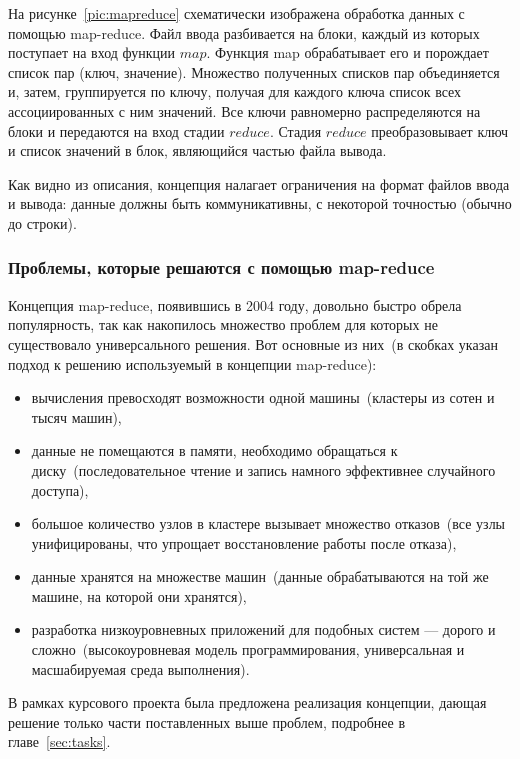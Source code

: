 \documentclass[12pt,a4paper,oneside]{extarticle}
\begin{document}
        На рисунке~\ref{pic:mapreduce} схематически изображена обработка данных с помощью map-reduce. Файл ввода разбивается на блоки, каждый из которых поступает на вход функции $map$. Функция map обрабатывает его и порождает список пар (ключ, значение). Множество полученных списков пар объединяется и, затем, группируется по ключу, получая для каждого ключа список всех ассоциированных с ним значений. Все ключи равномерно распределяются на блоки и передаются на вход стадии $reduce$. Стадия $reduce$ преобразовывает ключ и список значений в блок, являющийся частью файла вывода.

        Как видно из описания, концепция налагает ограничения на формат файлов ввода и вывода: данные должны быть коммуникативны, с некоторой точностью (обычно до строки).
    \clearpage

        \subsubsection{Проблемы, которые решаются с помощью map-reduce}
            Концепция map-reduce, появившись в 2004 году, довольно быстро обрела популярность, так как накопилось множество проблем для которых не существовало универсального решения. Вот основные из них~(в скобках указан подход к решению используемый в концепции map-reduce):

            \begin{itemize}
                \item вычисления превосходят возможности одной машины~(кластеры из сотен и тысяч машин),
                \item данные не помещаются в памяти, необходимо обращаться к диску~(последовательное чтение и запись намного эффективнее случайного доступа),
                \item большое количество узлов в кластере вызывает множество отказов~(все узлы унифицированы, что упрощает восстановление работы после отказа),
                \item данные хранятся на множестве машин~(данные обрабатываются на той же машине, на которой они хранятся),
                \item разработка низкоуровневных приложений для подобных систем --- дорого и сложно~(высокоуровневая модель программирования, универсальная и масшабируемая среда выполнения).
            \end{itemize} 

            В рамках курсового проекта была предложена реализация концепции, дающая решение только части поставленных выше проблем, подробнее в главе~\ref{sec:tasks}.
\end{document}
